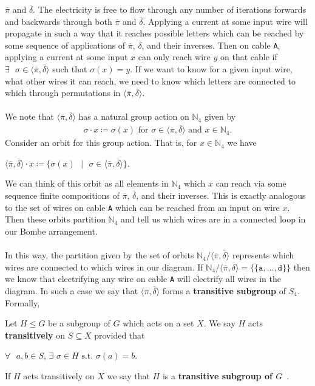 $\overline\pi$ and $\overline\delta$. The electricity is free to flow
through any number of iterations forwards and backwards through both
$\overline\pi$ and $\overline\delta$. Applying a current at some
input wire will propagate in such a way that it reaches possible
letters which can be reached by some sequence of applications of
$\overline\pi$, $\overline\delta$, and their inverses. Then on cable
\texttt{A}, applying a current at some input $x$ can only reach wire
$y$ on that cable if $\exists\text{ }\sigma\in\langle\overline\pi,
\overline\delta\rangle$ such that $\sigma(x) = y$. If we want to know
for a given input wire, what other wires it can reach, we need to
know which letters are connected to which through permutations in
$\langle\overline\pi, \overline\delta\rangle$.
\\\\We note that $\langle\overline\pi, \overline\delta\rangle$ has a
natural group action on $\mathbb{N}_{4}$ given by
\begin{align*}
  \sigma\cdot{x} \coloneq \sigma(x)\text{ for
  }\sigma\in\langle\overline\pi, \overline\delta\rangle\text{ and
  }x\in\mathbb{N}_{4}.
\end{align*}
Consider an orbit for this group action. That is, for
$x\in\mathbb{N}_{4}$ we have
\begin{center}
  $\langle\overline\pi, \overline\delta\rangle\cdot
  x\coloneq\{\sigma(x)\text{ }|\text{ }\sigma\in\langle\overline\pi,
  \overline\delta\rangle\}$.
\end{center}
\noindent We can think of this orbit as all elements in
$\mathbb{N}_{4}$ which $x$ can reach via some sequence finite
compositions of $\overline\pi$, $\overline\delta$, and their
inverses. This is exactly analogous to the set of wires on cable
\texttt{A} which can be reached from an input on wire $x$. Then these
orbits partition $\mathbb{N}_{4}$ and tell us which wires are in a
connected loop in our Bombe arrangement.
\\\\In this way, the partition given by the set of orbits
$\mathbb{N}_{4}/\langle\overline\pi, \overline\delta\rangle$
represents which wires are connected to which wires in our diagram.
If $\mathbb{N}_{4}/\langle\overline\pi, \overline\delta\rangle =
\{\{\texttt{a},\dots,\texttt{d}\}\}$ then we know that electrifying
any wire on cable \texttt{A} will electrify all wires in the diagram.
In such a case we say that $\langle\overline\pi,
\overline\delta\rangle$ forms a {\bf{transitive subgroup}} of $S_4$. Formally,
\begin{definition}
  Let $H\le{G}$ be a subgroup of $G$ which acts on a set $X$. We say
  $H$ acts {\bf{transitively}} on $S\subseteq{X}$ provided that
  \begin{center}
    $\forall\text{ }a,b\in S\text{, }\exists\text{
    }\sigma\in{H}\text{ s.t. }\sigma(a)=b$.
  \end{center}
  If $H$ acts transitively on $X$ we say that $H$ is a
  {\bf{transitive subgroup of $G$}}~\cite[p.~177]{artin2011algebra}.
\end{definition}
